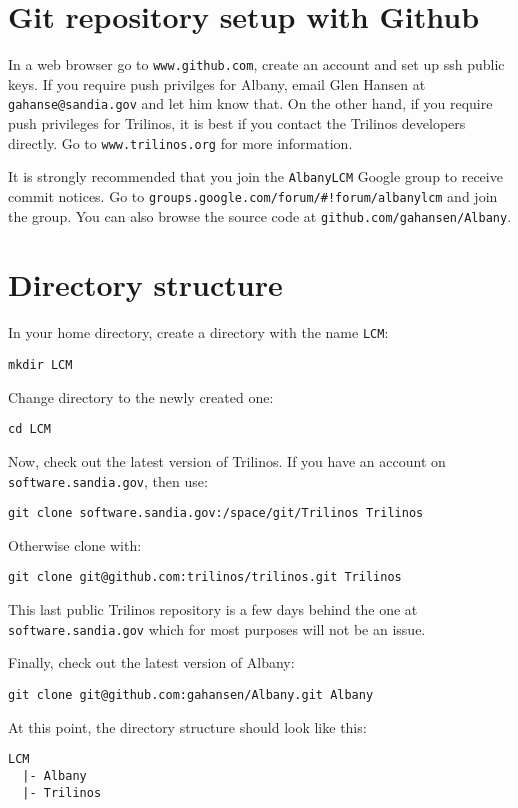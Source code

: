 \documentclass[10pt,a4paper]{article} \usepackage[utf8]{inputenc}
\begin{document}
\section{Git repository setup with Github}

In a web browser go to \verb+www.github.com+, create an account and
set up ssh public keys. If you require push privilges for Albany,
email Glen Hansen at \verb+gahanse@sandia.gov+ and let him know
that. On the other hand, if you require push privileges for Trilinos,
it is best if you contact the Trilinos developers directly. Go to
\verb+www.trilinos.org+ for more information.

It is strongly recommended that you join the \verb+AlbanyLCM+ Google
group to receive commit notices. Go to
\verb+groups.google.com/forum/#!forum/albanylcm+ and join the
group. You can also browse the source code at
\verb+github.com/gahansen/Albany+.

\section{Directory structure}
In your home directory, create a directory with the name \verb+LCM+:
\begin{verbatim}
mkdir LCM
\end{verbatim}

Change directory to the newly created one:
\begin{verbatim}
cd LCM
\end{verbatim}

Now, check out the latest version of Trilinos. If you have an account on
\verb+software.sandia.gov+, then use:
\begin{verbatim}
git clone software.sandia.gov:/space/git/Trilinos Trilinos
\end{verbatim}
Otherwise clone with:
\begin{verbatim}
git clone git@github.com:trilinos/trilinos.git Trilinos
\end{verbatim}
This last public Trilinos repository is a few days behind the one at
\verb+software.sandia.gov+ which for most purposes will not be an issue.

Finally, check out the latest version of Albany:
\begin{verbatim}
git clone git@github.com:gahansen/Albany.git Albany
\end{verbatim}

At this point, the directory structure should look like this:
\begin{verbatim}
LCM
  |- Albany
  |- Trilinos
\end{verbatim}
\end{document}
